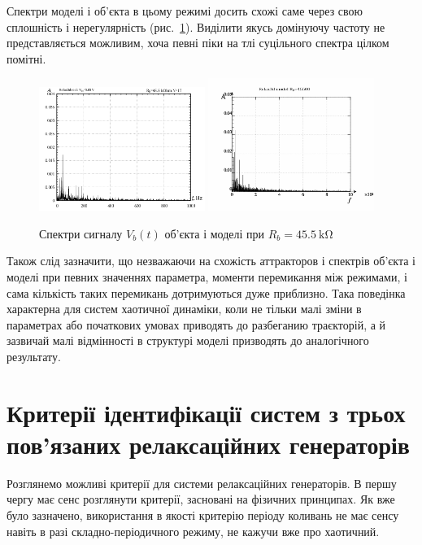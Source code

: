 Спектри моделі і об'єкта в цьому режимі досить схожі саме через
свою сплошність і нерегулярність (рис.~\ref{atu:f:relax3d_mo_f_17}). Виділити
якусь домінуючу частоту не представляється можливим, хоча
певні піки на тлі суцільного спектра цілком помітні.

\begin{figure}[htb!]
  \centerline{
    \hfill
    \includegraphics[width=0.48\textwidth]{p/relax3_f_17.png}
    \hfill
    \includegraphics[width=0.48\textwidth]{p/relax3d_read_q-p_fm_17a.png}
    \hfill
  }
\caption{Спектри сигналу $ V_b (t) $ об'єкта і моделі при $ R_b = \SI{45.5}{\kilo \ohm} $}
\label{atu:f:relax3d_mo_f_17}
\end{figure}

Також слід зазначити, що незважаючи на схожість аттракторов
і спектрів об'єкта і моделі при певних значеннях параметра,
моменти перемикання між режимами, і сама кількість таких
перемикань дотримуються дуже приблизно. Така поведінка
характерна для систем хаотичної динаміки, коли не тільки
малі зміни в параметрах або початкових умовах приводять до
разбеганию траєкторій, а й зазвичай малі відмінності в
структурі моделі призводять до аналогічного результату.



\section{Критерії ідентифікації систем з трьох пов'язаних релаксаційних генераторів}

Розглянемо можливі критерії для системи релаксаційних
генераторів. В першу чергу має сенс розглянути критерії,
засновані на фізичних принципах. Як вже було зазначено,
використання в якості критерію періоду коливань не
має сенсу навіть в разі складно-періодичного режиму, не
кажучи вже про хаотичний.

